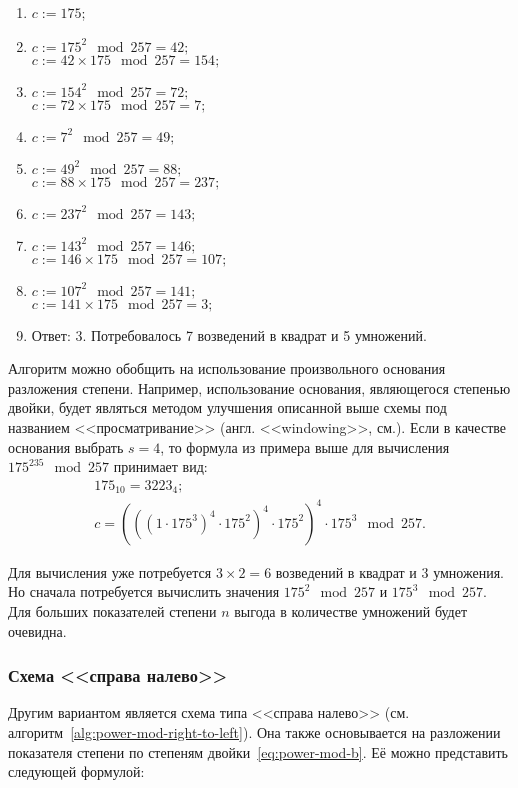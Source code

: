 \begin{enumerate}
	\item $c := 175$;
	\item $c := 175^2 \mod 257 = 42; $\\
		$c := 42 \times 175 \mod 257 = 154;$
	\item $c := 154^2 \mod 257 = 72; $\\
		$c := 72 \times 175 \mod 257 = 7;$
	\item $c := 7^2 \mod 257 = 49; $
	\item $c := 49^2 \mod 257 = 88; $\\
		$c := 88 \times 175 \mod 257 = 237;$
	\item $c := 237^2 \mod 257 = 143; $
	\item $c := 143^2 \mod 257 = 146; $\\
		$c := 146 \times 175 \mod 257 = 107;$
	\item $c := 107^2 \mod 257 = 141; $\\
		$c := 141 \times 175 \mod 257 = 3;$
	\item Ответ: 3. Потребовалось 7 возведений в квадрат и 5 умножений.
\end{enumerate}
\exampleend

Алгоритм можно обобщить на использование произвольного основания разложения степени. Например, использование основания, являющегося степенью двойки, будет являться методом улучшения описанной выше схемы под названием <<просматривание>> (англ. <<windowing>>, см.\cite[9.3.2. Улучшение схем возведение в степень]{Crandall:Pomerance:2011}). Если в качестве основания выбрать $s = 4$, то формула из примера выше для вычисления $175^{235} \mod 257$ принимает вид:
\[\begin{array}{l}
	175_{10} = 3223_{4}; \\
	c = \left(\left(\left( 1 \cdot 175^3 \right)^4 \cdot 175^2 \right)^4 \cdot 175^2 \right)^4 \cdot 175^3 \mod 257.
\end{array}\]

Для вычисления уже потребуется $3 \times 2 = 6$ возведений в квадрат и $3$ умножения. Но сначала потребуется вычислить значения $175^2 \mod 257$ и $175^3 \mod 257$. Для больших показателей степени $n$ выгода в количестве умножений будет очевидна.

\subsubsection{Схема <<справа налево>>}
Другим вариантом является схема типа <<справа налево>> (см. алгоритм~\ref{alg:power-mod-right-to-left}). Она также основывается на разложении показателя степени по степеням двойки~\ref{eq:power-mod-b}. Её можно представить следующей формулой:

